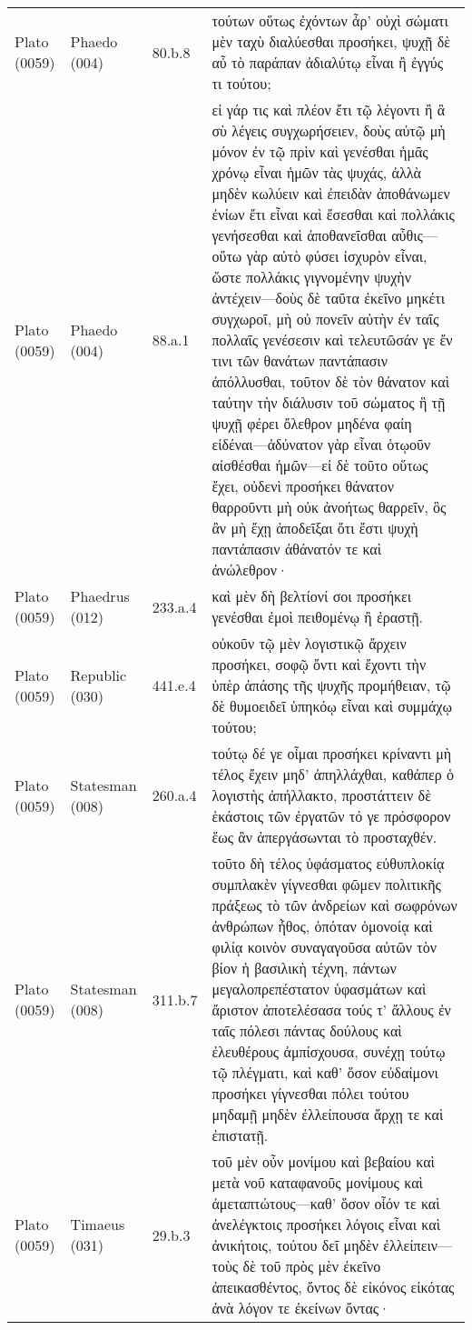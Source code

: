\begin{longtable}{llll}
Plato (0059) & Phaedo (004) & 80.b.8 & τούτων οὕτως ἐχόντων ἆρ’ οὐχὶ σώματι μὲν ταχὺ διαλύεσθαι προσήκει, ψυχῇ δὲ αὖ τὸ παράπαν ἀδιαλύτῳ εἶναι ἢ ἐγγύς τι τούτου;\\
Plato (0059) & Phaedo (004) & 88.a.1 & εἰ γάρ τις καὶ πλέον ἔτι τῷ λέγοντι ἢ ἃ σὺ λέγεις συγχωρήσειεν, δοὺς αὐτῷ μὴ μόνον ἐν τῷ πρὶν καὶ γενέσθαι ἡμᾶς χρόνῳ εἶναι ἡμῶν τὰς ψυχάς, ἀλλὰ μηδὲν κωλύειν καὶ ἐπειδὰν ἀποθάνωμεν ἐνίων ἔτι εἶναι καὶ ἔσεσθαι καὶ πολλάκις γενήσεσθαι καὶ ἀποθανεῖσθαι αὖθις—οὕτω γὰρ αὐτὸ φύσει ἰσχυρὸν εἶναι, ὥστε πολλάκις γιγνομένην ψυχὴν ἀντέχειν—δοὺς δὲ ταῦτα ἐκεῖνο μηκέτι συγχωροῖ, μὴ οὐ πονεῖν αὐτὴν ἐν ταῖς πολλαῖς γενέσεσιν καὶ τελευτῶσάν γε ἔν τινι τῶν θανάτων παντάπασιν ἀπόλλυσθαι, τοῦτον δὲ τὸν θάνατον καὶ ταύτην τὴν διάλυσιν τοῦ σώματος ἣ τῇ ψυχῇ φέρει ὄλεθρον μηδένα φαίη εἰδέναι—ἀδύνατον γὰρ εἶναι ὁτῳοῦν αἰσθέσθαι ἡμῶν—εἰ δὲ τοῦτο οὕτως ἔχει, οὐδενὶ προσήκει θάνατον θαρροῦντι μὴ οὐκ ἀνοήτως θαρρεῖν, ὃς ἂν μὴ ἔχῃ ἀποδεῖξαι ὅτι ἔστι ψυχὴ παντάπασιν ἀθάνατόν τε καὶ ἀνώλεθρον·\\
Plato (0059) & Phaedrus (012) & 233.a.4 & καὶ μὲν δὴ βελτίονί σοι προσήκει γενέσθαι ἐμοὶ πειθομένῳ ἢ ἐραστῇ.\\
\addlinespace
Plato (0059) & Republic (030) & 441.e.4 & οὐκοῦν τῷ μὲν λογιστικῷ ἄρχειν προσήκει, σοφῷ ὄντι καὶ ἔχοντι τὴν ὑπὲρ ἁπάσης τῆς ψυχῆς προμήθειαν, τῷ δὲ θυμοειδεῖ ὑπηκόῳ εἶναι καὶ συμμάχῳ τούτου;\\
Plato (0059) & Statesman (008) & 260.a.4 & τούτῳ δέ γε οἶμαι προσήκει κρίναντι μὴ τέλος ἔχειν μηδ’ ἀπηλλάχθαι, καθάπερ ὁ λογιστὴς ἀπήλλακτο, προστάττειν δὲ ἑκάστοις τῶν ἐργατῶν τό γε πρόσφορον ἕως ἂν ἀπεργάσωνται τὸ προσταχθέν.\\
Plato (0059) & Statesman (008) & 311.b.7 & τοῦτο δὴ τέλος ὑφάσματος εὐθυπλοκίᾳ συμπλακὲν γίγνεσθαι φῶμεν πολιτικῆς πράξεως τὸ τῶν ἀνδρείων καὶ σωφρόνων ἀνθρώπων ἦθος, ὁπόταν ὁμονοίᾳ καὶ φιλίᾳ κοινὸν συναγαγοῦσα αὐτῶν τὸν βίον ἡ βασιλικὴ τέχνη, πάντων μεγαλοπρεπέστατον ὑφασμάτων καὶ ἄριστον ἀποτελέσασα τούς τ’ ἄλλους ἐν ταῖς πόλεσι πάντας δούλους καὶ ἐλευθέρους ἀμπίσχουσα, συνέχῃ τούτῳ τῷ πλέγματι, καὶ καθ’ ὅσον εὐδαίμονι προσήκει γίγνεσθαι πόλει τούτου μηδαμῇ μηδὲν ἐλλείπουσα ἄρχῃ τε καὶ ἐπιστατῇ.\\
Plato (0059) & Timaeus (031) & 29.b.3 & τοῦ μὲν οὖν μονίμου καὶ βεβαίου καὶ μετὰ νοῦ καταφανοῦς μονίμους καὶ ἀμεταπτώτους—καθ’ ὅσον οἷόν τε καὶ ἀνελέγκτοις προσήκει λόγοις εἶναι καὶ ἀνικήτοις, τούτου δεῖ μηδὲν ἐλλείπειν—τοὺς δὲ τοῦ πρὸς μὲν ἐκεῖνο ἀπεικασθέντος, ὄντος δὲ εἰκόνος εἰκότας ἀνὰ λόγον τε ἐκείνων ὄντας·\\

\end{longtable}
